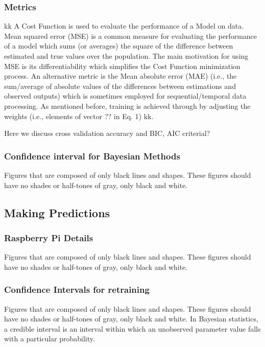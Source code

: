 \documentclass[journal,twoside,web]{ieeecolor}
\begin{document}
\subsubsection{Metrics}
{
kk A Cost Function is used to evaluate the performance of a Model on data. Mean squared error (MSE) is a common measure for evaluating the performance of a model which sums (or averages) the square of the difference between estimated and true values over the population. The main motivation for using MSE is its differentiability which simplifies the Cost Function minimization process. An alternative metric is the Mean absolute error (MAE) (i.e., the sum/average of absolute values of the differences between estimations and observed outputs) which is sometimes employed for sequential/temporal data processing. As mentioned before, training is achieved through by adjusting the weights (i.e., elements of vector ?? in Eq. 1) kk. }


Here we discuss cross validation accuracy and BIC, AIC criterial? 

\subsubsection{Confidence interval for Bayesian Methods}
{Figures that are composed of only black lines and shapes. These figures 
should have no shades or half-tones of gray, only black and white.}


\subsection{Making Predictions}

\subsubsection{Raspberry Pi Details}
{Figures that are composed of only black lines and shapes. These figures 
should have no shades or half-tones of gray, only black and white.}

\subsubsection{Confidence Intervals for retraining}
{Figures that are composed of only black lines and shapes. These figures 
should have no shades or half-tones of gray, only black and white.}
In Bayesian statistics, a credible interval is an interval within which an unobserved parameter value falls with a particular probability. 
\end{document}
